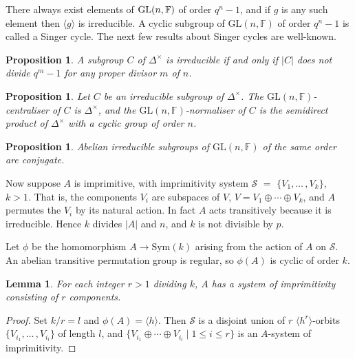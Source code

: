 \documentclass[12pt]{amsart}
\newtheorem{lemma}[theorem]{Lemma}
\newtheorem{proposition}[theorem]{Proposition}
\theoremstyle{definition}
\theoremstyle{remark}
\begin{document}
 There always exist elements of ${\rm GL}(n,\mathbb{F})$ of 
 order $q^n-1$, and if $g$ is any such element then
 $\langle g  \rangle$ is irreducible.
 A cyclic subgroup of $\mathrm{GL}(n,\mathbb{F})$ of order
 $q^n-1$ is called a Singer cycle. The next few results
 about Singer cycles are well-known.
\begin{proposition}
\label{charirredab}
 A subgroup $C$ of $\Delta^{\! \times}$ is irreducible if 
 and only if $|C|$ does not divide $q^m-1$ for any 
 proper divisor $m$ of $n$.  
\end{proposition}
\begin{proposition}
\label{normcentr}
 Let $C$ be an irreducible subgroup of $\Delta^{\! \times}$.
 The $\mathrm{GL}(n,\mathbb{F})$-centraliser of 
 $C$ is $\Delta^{\! \times}$, and the 
 $\mathrm{GL}(n,\mathbb{F})$-normaliser of 
 $C$ is the semidirect product of   
 $\Delta^{\! \times}$ with a cyclic group of order
 $n$.
\end{proposition}
\begin{proposition}
\label{conjab}
 Abelian irreducible subgroups 
 of $\mathrm{GL}(n,\mathbb{F})$
 of the same order are conjugate.
\end{proposition}

 Now suppose $A$ is imprimitive, with imprimitivity
 system $\mathcal{S}$ $=$ $\{ V_1, \ldots \! \, ,V_k\}$, 
 $k > 1$. That is, the 
 components $V_i$ are subspaces of $V$,  
 $V = V_1 \oplus \cdots \oplus V_k$, 
 and $A$ permutes the $V_i$ by its natural action.
 In fact $A$ acts transitively because it is irreducible. 
 Hence $k$ divides $|A|$ and $n$, and 
 $k$ is not divisible by $p$.
 
 Let $\phi$ be the homomorphism  $A \rightarrow \mathrm{Sym}(k)$
 arising from the
 action of $A$ on $\mathcal{S}$. An abelian transitive permutation 
 group is regular, so $\phi(A)$ is cyclic of order $k$.     
\begin{lemma}
\label{sizeprim}
 For each integer $r>1$ dividing $k$, $A$  
 has a system of imprimitivity consisting of $r$
 components.
\end{lemma}
\begin{proof}
 Set $k/r=l$ and $\phi(A) = \langle h\rangle$.  
 Then $\mathcal{S}$ is a disjoint union of $r$ 
 $\langle h^r \rangle$-orbits 
 $\{ V_{i_1} , \ldots \, \! , V_{i_l}\}$ of length $l$, 
 and $\{ V_{i_1} \oplus \cdots \oplus V_{i_l} 
 \mid 1 \leq i \leq r \}$ 
 is an $A$-system of imprimitivity.
\end{proof}
\end{document}
